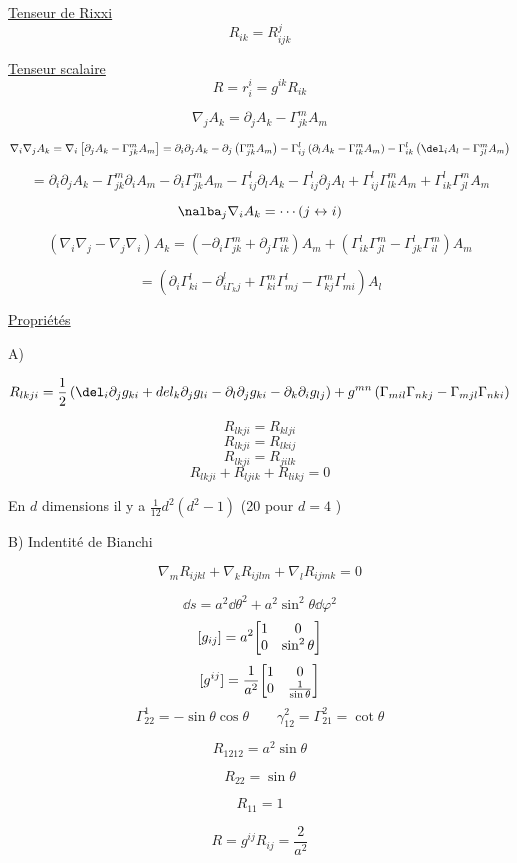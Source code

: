 \underline{Tenseur de Rixxi} 
$$R_{ik} = R_{ijk}^{j}$$ 


\underline{Tenseur scalaire} 
$$R=r_i^{i}= g^{ik}R_{ik} $$ 


$$\nabla_j A_k = \partial_j A_k - \Gamma_{jk}^{m}A_m $$ 

$$\nabla_{i}{\nabla_j} A_k = \nabla_i \left[ \partial_j A_k - \Gamma_{jk}^{m}A_m \right] = \partial_i \partial_j A_k - \partial_j \left( \Gamma_{jk}^{m}A_m  \right) -\Gamma_{ij}^{l}\left( \partial_l A_k - \Gamma_{lk}^{m}A_m  \right) - \Gamma_{ik}^{l}\left( \del_i A_l - \Gamma_{jl}^{m}A_m  \right) $$ 

$$= \partial_i \partial_j A_k - \Gamma_{jk}^{m}\partial_i A_m -\partial_i \Gamma_{jk}^{m}A_m -\Gamma_{ij}^{l}\partial_l A_k - \Gamma_{ij}^{l}\partial_j A_l + \Gamma_{ij}^{l}\Gamma_{lk}^{m}A_m + \Gamma_{ik}^{l}\Gamma_{jl}^{m}A_m $$ 

$$\nalba_j \nabla_i A_k = \dotsb(j\leftrightarrow i)$$ 

$$\left( \nabla_i\nabla_j -\nabla_j \nabla_i \right)A_k = \left( - \partial_i \Gamma_{jk}^{m}+ \partial_j \Gamma_{ik}^{m} \right) A_m + \left( \Gamma_{ik}^{l}\Gamma_{jl}^{m}- \Gamma_{jk}^{l}\Gamma_{il}^{m} \right) A_m $$ 


$$= (\partial_i \Gamma_{ki}^{l}-\partial_{i\Gamma_kj}^{l}+ \Gamma_{ki}^{m}\Gamma_{mj}^{l}- \Gamma_{kj}^{m}\Gamma_{mi}^{l})A_l $$ 

\underline{Propriétés } 

A)

$$R_{lkji} = \frac{1}{2} \left( \del_i \partial_j g_{ki} + del_k \partial_j g_{li} - \partial_l \partial_j g_{ki} - \partial_k \partial_i g_{lj}  \right) +g^{mn}\left( \Gamma_{mil} \Gamma_{nkj} - \Gamma_{mjl} \Gamma_{nki} \right)  $$ 


$$R_{lkji} = R_{klji} $$ 
$$R_{lkji} = R_{lkij} $$ 
$$R_{lkji} = R_{jilk} $$ 
$$R_{lkji} + R_{ljik} + R_{likj} =0$$ 

En $d$ dimensions il y a $ \frac{1}{12} d^{2}(d^2-1)$ (20 pour $d=4$ )   

B) Indentité de Bianchi


$$\nabla_m R_{ijkl}+ \nabla_k R_{ijlm} + \nabla_l R_{ijmk} =0 $$ 

\begin{tcolorbox}[title=Exemple 1: sphère de rayon a]

	$$\dd s = a^{2}\dd \theta^{2}+ a^{2}\sin^{2}\theta\dd \varphi^2$$ 
	$$[g_{ij} ] = a^{2}\mqty[1 & 0 \\ 0 & \sin^2\theta]$$ 
	$$[g^{ij}] = \frac{1}{a^2} \mqty[ 1 & 0 \\ 0 & \frac{1}{\sin\theta}  ]$$ 
	$$\Gamma_{22}^{1}= -\sin\theta\cos\theta \qquad \gamma_{12}^{2}=\Gamma_{21}^{2}= \cot\theta$$ 

$$R_{1212}  =a^2\sin\theta$$ 

$$R_{22} = \sin\theta$$ 

$$R_{11} = 1$$ 

$$R = g^{ij}R_{ij} = \frac{2}{a^2} $$ 
	 
\end{tcolorbox}

